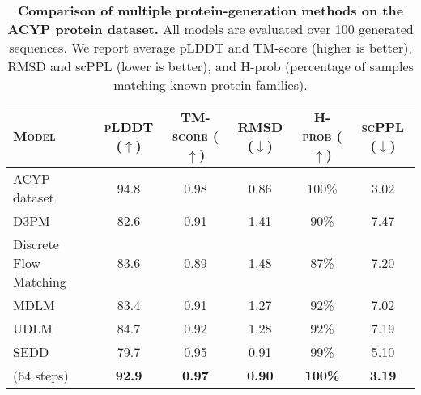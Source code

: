 \begin{table*}[t]
    \centering
    \caption{\textbf{Comparison of multiple protein-generation methods on the ACYP protein dataset.} All models are evaluated over 100 generated sequences. We report average pLDDT and TM-score (higher is better), RMSD and scPPL (lower is better), and H-prob (percentage of samples matching known protein families). 
    }
    \vspace{3pt}
    \begin{adjustbox}{max width=0.85\linewidth}
    \begin{tabular}{lcccc|c}
    \toprule
        \textsc{Model} 
        & \textsc{pLDDT ($\uparrow$)} 
        & \textsc{TM-score ($\uparrow$)} 
        & \textsc{RMSD ($\downarrow$)} 
        & \textsc{H-prob ($\uparrow$)} 
        & \textsc{scPPL ($\downarrow$)}  \\
    \midrule
        {ACYP dataset} 
        & 94.8 & 0.98 & 0.86 & 100\% & 3.02  \\
    \midrule
        D3PM      
        & 82.6 & 0.91 & 1.41 & 90\% & 7.47  \\
        Discrete Flow Matching
        & 83.6 & 0.89 & 1.48 & 87\% & 7.20  \\
        MDLM      
        & 83.4 & 0.91 & 1.27 & 92\% & 7.02  \\
        UDLM      
        & 84.7 & 0.92 & 1.28 & 92\% & 7.19  \\
        SEDD      
        & 79.7 & 0.95 & 0.91 & 99\% & 5.10  \\
    \midrule
        \textbf{\method{}} (64 steps) 
        & \textbf{92.9} & \textbf{0.97} & \textbf{0.90} & \textbf{100\%} & \textbf{3.19}  \\
    \bottomrule
    \end{tabular}
    \end{adjustbox}
    \label{tab:protein}
    \vspace{-5pt}
\end{table*}